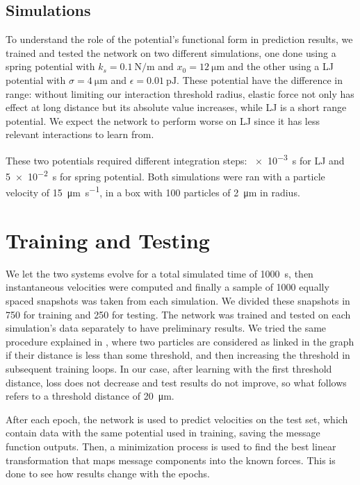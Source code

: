 \documentclass[../../master_thesis_np.tex]{subfiles}
\begin{document}
\subsection{Simulations}
To understand the role of the potential's functional form in prediction results, we trained and tested the network on two different simulations, one done using a spring potential with $k_s = \SI{0.1}{\newton\per\meter}$ and $x_0 = \SI{12}{\um}$ and the other using a LJ potential with $\sigma = \SI{4}{\um}$ and $\epsilon = \SI{0.01}{\pico\joule}$.
These potential have the difference in range: without limiting our interaction threshold radius, elastic force not only has effect at long distance but its absolute value increases, while LJ is a short range potential.
We expect the network to perform worse on LJ since it has less relevant interactions to learn from.

These two potentials required different integration steps: \SI{e-3}{\second} for LJ and \SI{5e-2}{\second} for spring potential.
Both simulations were ran with a particle velocity of \SI{15}{\um \per \second}, in a  box with \num{100} particles of \SI{2}{\um} in radius.

\section{Training and Testing}

We let the two systems evolve for a total simulated time of \SI{1000}{\second}, then instantaneous velocities were computed and finally a sample of \num{1000} equally spaced snapshots was taken from each simulation.
We divided these snapshots in \num{750} for training and \num{250} for testing.
The network was trained and tested on each simulation's data separately to have preliminary results.
We tried the same procedure explained in \cite{ruiz-garcia_discovering_2024}, where two particles are considered as linked in the graph if their distance is less than some threshold, and then increasing the threshold in subsequent training loops.
In our case, after learning with the first threshold distance, loss does not decrease and test results do not improve, so what follows refers to a threshold distance of \SI{20}{\um}.

After each epoch, the network is used to predict velocities on the test set, which contain data with the same potential used in training, saving the message function outputs.
Then, a minimization process is used to find the best linear transformation that maps message components into the known forces.
This is done to see how results change with the epochs.
\end{document}
